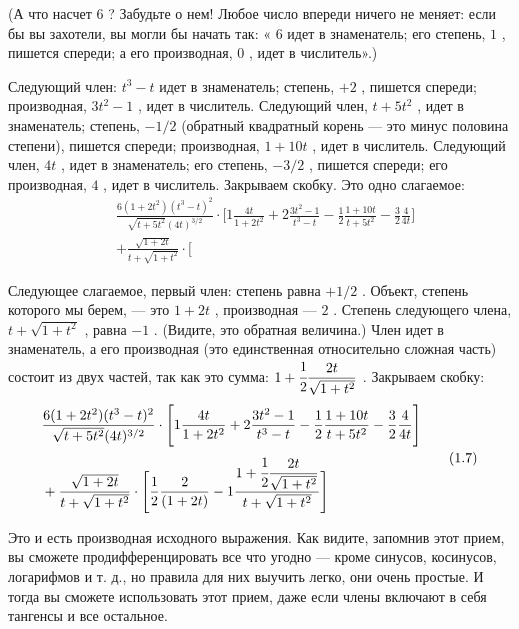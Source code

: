 \documentclass[11pt,oneside]{article}
\begin{document}
(А что насчет \(6\) ? Забудьте о нем! Любое число впереди ничего не меняет: если бы вы захотели, вы могли бы начать так: « \(6\) идет в знаменатель; его степень, \(1\) , пишется спереди; а его производная, \(0\) , идет в числитель».)\par

Следующий член: \(t^3-t\) идет в знаменатель; степень, \(+2\) , пишется спереди; производная, \(3t^2-1\) , идет в числитель. Следующий член, \(t+5t^2\) , идет в знаменатель; степень, \(-1/2\) (обратный квадратный корень --- это минус половина степени), пишется спереди; производная, \(1+10t\) , идет в числитель. Следующий член, \(4t\) , идет в знаменатель; его степень, \(-3/2\) , пишется спереди; его производная, \(4\) , идет в числитель. Закрываем скобку. Это одно слагаемое: 
\begin{equation*} \begin{aligned} &\frac{6(1+2t^2)(t^3-t)^2}{\sqrt{t+5t^2}(4t)^{3/2}}\cdot\Bigg[ 1\frac{4t}{1+2t^2} + 2\frac{3t^2-1}{t^3-t} -\frac12\frac{1+10t}{t+5t^2} - \frac32\frac4{4t}\Bigg]\\[.5ex] &+\frac{\sqrt{1+2t}}{t+\sqrt{1+t^2}}\cdot\Bigg[ \end{aligned} \tag{1.6}
\label{Eq:TIPS:1:6} \end{equation*}
\par

Следующее слагаемое, первый член: степень равна \(+1/2\) . Объект, степень которого мы берем, --- это \(1+2t\) , производная --- \(2\) . Степень следующего члена, \(t+\sqrt{1+t^2}\) , равна \(-1\) . (Видите, это обратная величина.) Член идет в знаменатель, а его производная (это единственная относительно сложная часть) состоит из двух частей, так как это сумма: \(1+\cfrac{1}{2}\dfrac{2t}{\sqrt{1+t^2}}\) . Закрываем скобку: 
\begin{equation*} \begin{aligned} &\frac{6(1+2t^2)(t^3-t)^2}{\sqrt{t+5t^2}(4t)^{3/2}}\cdot\Bigg[ 1\frac{4t}{1+2t^2} + 2\frac{3t^2-1}{t^3-t} -\frac12\frac{1+10t}{t+5t^2} - \frac32\frac4{4t}\Bigg]\\[.5ex] &+\frac{\sqrt{1+2t}}{t+\sqrt{1+t^2}}\cdot\Bigg[ \frac12\frac2{(1+2t)} - 1\frac{1+\cfrac12\dfrac{2t}{\sqrt{1+t^2}}}{t+\sqrt{1+t^2}}\Bigg] \end{aligned} \tag{1.7}
\label{Eq:TIPS:1:7} \end{equation*}
\par

Это и есть производная исходного выражения. Как видите, запомнив этот прием, вы сможете продифференцировать все что угодно --- кроме синусов, косинусов, логарифмов и т. д., но правила для них выучить легко, они очень простые. И тогда вы сможете использовать этот прием, даже если члены включают в себя тангенсы и все остальное.\par
\end{document}
